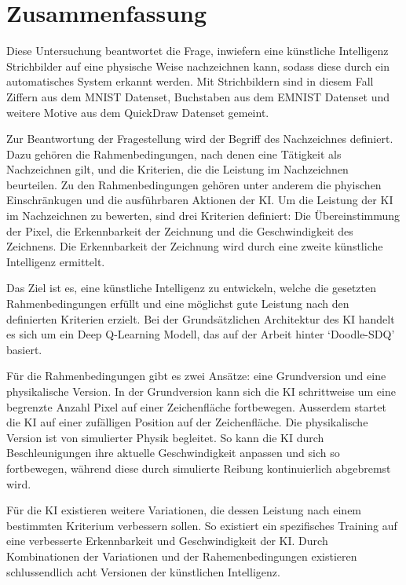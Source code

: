 \chapter{Zusammenfassung}\label{zusammenfassung}
Diese Untersuchung beantwortet die Frage, inwiefern eine künstliche Intelligenz
Strichbilder auf eine physische Weise nachzeichnen kann, sodass diese durch ein
automatisches System erkannt werden. Mit Strichbildern sind in diesem
Fall Ziffern aus dem MNIST Datenset, Buchstaben aus dem EMNIST Datenset und
weitere Motive aus dem QuickDraw Datenset gemeint. 

Zur Beantwortung der Fragestellung wird der Begriff des Nachzeichnes definiert.
Dazu gehören die Rahmenbedingungen, nach denen eine Tätigkeit als Nachzeichnen
gilt, und die Kriterien, die die Leistung im Nachzeichnen beurteilen. Zu den
Rahmenbedingungen gehören unter anderem die phyischen Einschränkugen und die
ausführbaren Aktionen der KI. Um die Leistung der KI im Nachzeichnen zu
bewerten, sind drei Kriterien definiert: Die Übereinstimmung der Pixel, die
Erkennbarkeit der Zeichnung und die Geschwindigkeit des Zeichnens. Die
Erkennbarkeit der Zeichnung wird durch eine zweite künstliche Intelligenz
ermittelt.

Das Ziel ist es, eine künstliche Intelligenz zu entwickeln, welche die gesetzten
Rahmenbedingungen erfüllt und eine möglichst gute Leistung nach den definierten
Kriterien erzielt. Bei der Grundsätzlichen Architektur des KI handelt es sich um
ein Deep Q-Learning Modell, das auf der Arbeit hinter `Doodle-SDQ'
\cite{zhou_learning_2018} basiert.

Für die Rahmenbedingungen gibt es zwei Ansätze: eine Grundversion und eine
physikalische Version. In der Grundversion kann sich die KI schrittweise um eine
begrenzte Anzahl Pixel auf einer Zeichenfläche fortbewegen. Ausserdem startet
die KI auf einer zufälligen Position auf der Zeichenfläche. Die physikalische
Version ist von simulierter Physik begleitet. So kann die KI durch
Beschleunigungen ihre aktuelle Geschwindigkeit anpassen und sich so fortbewegen,
während diese durch simulierte Reibung kontinuierlich abgebremst wird. 

Für die KI existieren weitere Variationen, die dessen Leistung nach einem
bestimmten Kriterium verbessern sollen. So existiert ein spezifisches Training
auf eine verbesserte Erkennbarkeit und Geschwindigkeit der KI. Durch
Kombinationen der Variationen und der Rahemenbedingungen existieren
schlussendlich acht Versionen der künstlichen Intelligenz.

